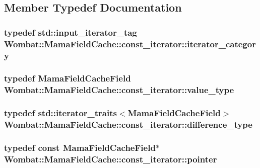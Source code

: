 \subsection{Member Typedef Documentation}
\hypertarget{classWombat_1_1MamaFieldCache_1_1const__iterator_a30252e663d775910e6c1d92d1efc4d68}{
\subsubsection[{iterator\_\-category}]{\setlength{\rightskip}{0pt plus 5cm}typedef std::input\_\-iterator\_\-tag {\bf Wombat::MamaFieldCache::const\_\-iterator::iterator\_\-category}}}
\label{classWombat_1_1MamaFieldCache_1_1const__iterator_a30252e663d775910e6c1d92d1efc4d68}
\hypertarget{classWombat_1_1MamaFieldCache_1_1const__iterator_a1f48e05772e82d28bf5f3fdc5e4bef8d}{
\subsubsection[{value\_\-type}]{\setlength{\rightskip}{0pt plus 5cm}typedef {\bf MamaFieldCacheField} {\bf Wombat::MamaFieldCache::const\_\-iterator::value\_\-type}}}
\label{classWombat_1_1MamaFieldCache_1_1const__iterator_a1f48e05772e82d28bf5f3fdc5e4bef8d}
\hypertarget{classWombat_1_1MamaFieldCache_1_1const__iterator_ae9756a7e7f48a0da504060a0f0ad61c3}{
\subsubsection[{difference\_\-type}]{\setlength{\rightskip}{0pt plus 5cm}typedef std::iterator\_\-traits$<${\bf MamaFieldCacheField}$>$ {\bf Wombat::MamaFieldCache::const\_\-iterator::difference\_\-type}}}
\label{classWombat_1_1MamaFieldCache_1_1const__iterator_ae9756a7e7f48a0da504060a0f0ad61c3}
\hypertarget{classWombat_1_1MamaFieldCache_1_1const__iterator_ad480d553eceafdfab681e2d9f42911bf}{
\subsubsection[{pointer}]{\setlength{\rightskip}{0pt plus 5cm}typedef const {\bf MamaFieldCacheField}$\ast$ {\bf Wombat::MamaFieldCache::const\_\-iterator::pointer}}}
